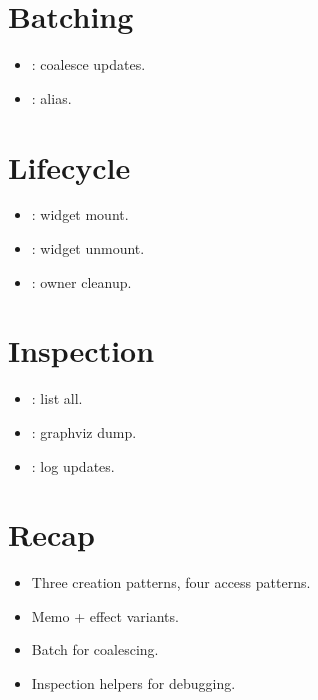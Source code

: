 \section{Batching}

\begin{itemize}[leftmargin=*]
  \item {}: coalesce updates.
  \item {}: alias.
\end{itemize}

\section{Lifecycle}

\begin{itemize}[leftmargin=*]
  \item {}: widget mount.
  \item {}: widget unmount.
  \item {}: owner cleanup.
\end{itemize}

\section{Inspection}

\begin{itemize}[leftmargin=*]
  \item {}: list all.
  \item {}: graphviz dump.
  \item {}: log updates.
\end{itemize}

\section{Recap}

\begin{recap}
\begin{itemize}[leftmargin=*]
  \item Three creation patterns, four access patterns.
  \item Memo + effect variants.
  \item Batch for coalescing.
  \item Inspection helpers for debugging.
\end{itemize}
\end{recap}

